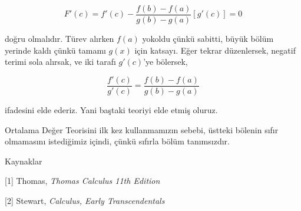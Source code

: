 \documentclass[12pt,fleqn]{article}\usepackage{../../common}
\begin{document}
$$ F'(c) = f'(c) - \frac{f(b)-f(a)}{g(b)-g(a)}[g'(c)] = 0$$

doğru olmalıdır. Türev alırken $f(a)$ yokoldu çünkü sabitti, büyük bölüm
yerinde kaldı çünkü tamamı $g(x)$ için katsayı. Eğer tekrar düzenlersek,
negatif terimi sola alırsak, ve iki tarafı $g'(c)$'ye bölersek,

$$ \frac{f'(c)}{g'(c)} = \frac{f(b)-f(a)}{g(b)-g(a)} $$

ifadesini elde ederiz. Yani baştaki teoriyi elde etmiş oluruz. 

Ortalama Değer Teorisini ilk kez kullanmamızın sebebi, üstteki bölenin sıfır
olmamasını istediğimiz içindi, çünkü sıfırla bölüm tanımsızdır. 

Kaynaklar

[1] Thomas, {\em Thomas Calculus 11th Edition}

[2] Stewart, {\em Calculus, Early Transcendentals}
\end{document}
